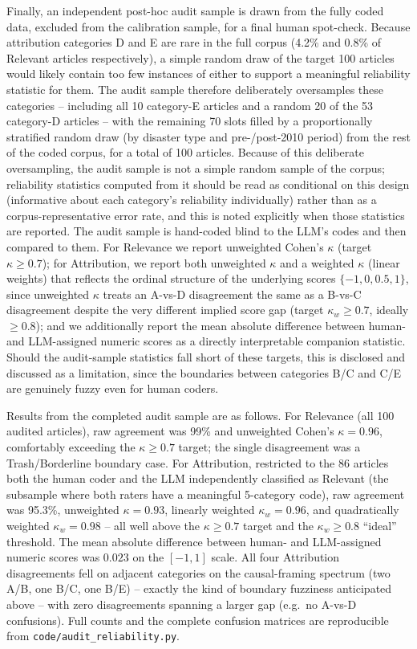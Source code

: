 \documentclass[12pt]{article}
\begin{document}
Finally, an independent post-hoc audit sample is drawn from the fully
coded data, excluded from the calibration sample, for a final human
spot-check. Because attribution categories D and E are rare in the
full corpus (4.2\% and 0.8\% of Relevant articles respectively), a
simple random draw of the target 100 articles would likely contain
too few instances of either to support a meaningful reliability
statistic for them. The audit sample therefore deliberately
oversamples these categories -- including all 10 category-E articles
and a random 20 of the 53 category-D articles -- with the remaining
70 slots filled by a proportionally stratified random draw (by
disaster type and pre-/post-2010 period) from the rest of the coded
corpus, for a total of 100 articles. Because of this deliberate
oversampling, the audit sample is not a simple random sample of the
corpus; reliability statistics computed from it should be read as
conditional on this design (informative about each category's
reliability individually) rather than as a corpus-representative
error rate, and this is noted explicitly when those statistics are
reported. The audit sample is hand-coded blind to the LLM's codes and
then compared to them. For Relevance we report unweighted Cohen's
$\kappa$ (target $\kappa \geq 0.7$); for Attribution, we report both
unweighted $\kappa$ and a weighted $\kappa$ (linear weights) that
reflects the ordinal structure of the underlying scores
$\{-1, 0, 0.5, 1\}$, since unweighted $\kappa$ treats an A-vs-D
disagreement the same as a B-vs-C disagreement despite the very
different implied score gap (target $\kappa_w \geq 0.7$, ideally
$\geq 0.8$); and we additionally report the mean absolute difference
between human- and LLM-assigned numeric scores as a directly
interpretable companion statistic. Should the audit-sample statistics
fall short of these targets, this is disclosed and discussed as a
limitation, since the boundaries between categories B/C and C/E are
genuinely fuzzy even for human coders.

Results from the completed audit sample are as follows. For Relevance (all 100 audited
articles), raw agreement was 99\% and unweighted Cohen's $\kappa = 0.96$,
comfortably exceeding the $\kappa \geq 0.7$ target; the single
disagreement was a Trash/Borderline boundary case. For Attribution,
restricted to the 86 articles both the human coder and the LLM
independently classified as Relevant (the subsample where both raters
have a meaningful 5-category code), raw agreement was 95.3\%, unweighted
$\kappa = 0.93$, linearly weighted $\kappa_w = 0.96$, and quadratically
weighted $\kappa_w = 0.98$ -- all well above the $\kappa \geq 0.7$ target
and the $\kappa_w \geq 0.8$ ``ideal'' threshold. The mean absolute
difference between human- and LLM-assigned numeric scores was $0.023$ on
the $[-1, 1]$ scale. All four Attribution disagreements fell on adjacent
categories on the causal-framing spectrum (two A/B, one B/C, one B/E) --
exactly the kind of boundary fuzziness anticipated above -- with zero
disagreements spanning a larger gap (e.g.\ no A-vs-D confusions). Full
counts and the complete confusion matrices are reproducible from
\texttt{code/audit\_reliability.py}.
\end{document}
